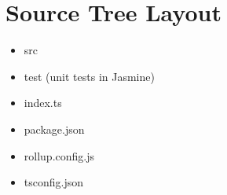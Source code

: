 \section{Source Tree Layout}


\begin{itemize}
  \item src
  \item test (unit tests in Jasmine)
\end{itemize}



\begin{itemize}
  \item index.ts
  \item package.json
  \item rollup.config.js
  \item tsconfig.json
\end{itemize}
